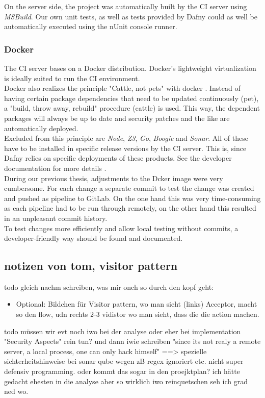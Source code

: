 On the server side, the project was automatically built by the CI server using \textit{MSBuild}.
Our own unit tests, as well as tests provided by Dafny could as well be automatically executed using the nUnit console runner.

\subsubsection{Docker}
The CI server bases on a Docker distribution.
Docker's lightweight virtualization is ideally suited to run the CI environment.\\

Docker also realizes the principle "Cattle, not pets" with docker \cite{pets-vs-cattle}.
Instead of having certain package dependencies that need to be updated continuously (pet), a "build, throw away, rebuild" procedure (cattle) is used.
This way, the dependent packages will always be up to date and security patches and the like are automatically deployed.\\

Excluded from this principle are \textit{Node}, \textit{Z3}, \textit{Go}, \textit{Boogie} and \textit{Sonar}.
All of these have to be installed in specific release versions by the CI server.
This is, since Dafny relies on specific deployments of these products.
See the developer documentation for more details \cite{dev}.\\

During our previous thesis, adjustments to the Dcker image were very cumbersome.
For each change a separate commit to test the change was created and pushed as pipeline to GitLab.
On the one hand this was very time-consuming as each pipeline had to be run through remotely,
on the other hand this resulted in an unpleasant commit history. \\

To test changes more efficiently and allow local testing without commits, a developer-friendly way should be found and documented.

\subsection{notizen von tom, visitor pattern}
todo
gleich nachm schreiben, was mir onch so durch den kopf geht:
\begin{itemize}
    \item Optional: Bildchen für Visitor pattern, wo man sieht (links) Acceptor, macht so den flow, udn rechts 2-3 vidistor wo man sieht, dass die die action machen.
\end{itemize}

todo
müssen wir evt noch iwo bei der analyse oder eher bei implementation "Security Aspects" rein tun?
und dann iwie schreiben "since its not realy a remote server, a local process, one can only hack himself"
==> spezielle sichterheitshinweise bei sonar qube wegen zB regex ignoriert etc. nicht super defensiv programming.
oder kommt das sogar in den proejktplan?
ich hätte gedacht ehesten in die analyse aber so wirklich iwo reinquetschen seh  ich grad ned wo.

